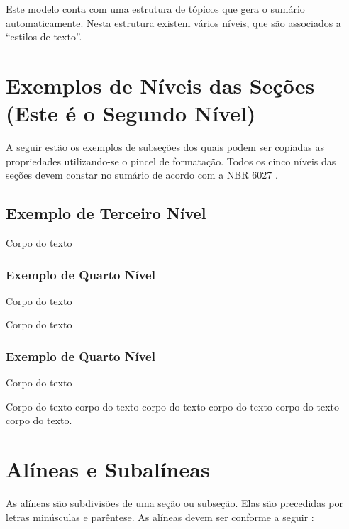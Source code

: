 \documentclass[
        oneside,      %
        english,			
        brazil			 
        ]{configcefetmglpd}
\begin{document}
Este modelo conta com uma estrutura de tópicos que gera o sumário automaticamente. Nesta estrutura existem vários níveis, que são associados a “estilos de texto”.

\section{Exemplos de Níveis das Seções (Este é o Segundo Nível)} %
\label{sec:exemplos_niveis_secao}
A seguir estão os exemplos de subseções dos quais podem ser copiadas as propriedades utilizando-se o pincel de formatação. 
Todos os cinco níveis das seções devem constar no sumário de acordo com a NBR 6027 \cite{bib:abnt6024}.

\subsection{Exemplo de Terceiro Nível} %
Corpo do texto

\subsubsection{Exemplo de Quarto Nível} %
Corpo do texto

Corpo do texto

\subsubsection{Exemplo de Quarto Nível}
Corpo do texto

Corpo do texto corpo do texto corpo do texto corpo do texto corpo do texto corpo do texto.

\section{Alíneas e Subalíneas} \label{sec:alineas_subalineas}
As alíneas são subdivisões de uma seção ou subseção. Elas são precedidas por letras minúsculas e parêntese. 
As alíneas devem ser conforme a seguir \cite{bib:abnt6024}:
\end{document}
